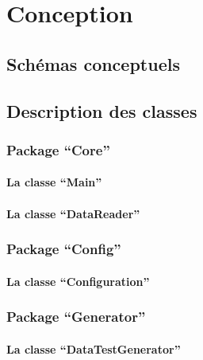 \documentclass[a4paper,10pt,openany,oneside]{sphinxmanual}
\begin{document}
\chapter{Conception}
\label{index:conception}

\section{Schémas conceptuels}
\label{index:schemas-conceptuels}

\section{Description des classes}
\label{index:description-des-classes}

\subsection{Package ``Core''}
\label{index:package-core}

\subsubsection{La classe ``Main''}
\label{index:la-classe-main}

\subsubsection{La classe ``DataReader''}
\label{index:la-classe-datareader}

\subsection{Package ``Config''}
\label{index:package-config}

\subsubsection{La classe ``Configuration''}
\label{index:la-classe-configuration}

\subsection{Package ``Generator''}
\label{index:package-generator}

\subsubsection{La classe ``DataTestGenerator''}
\label{index:la-classe-datatestgenerator}
\end{document}
